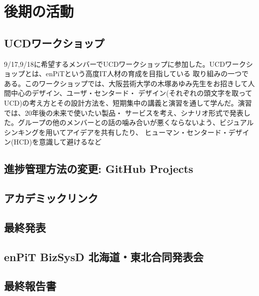 \chapter{後期の活動}

\section{UCDワークショップ}
 9/17,9/18に希望するメンバーでUCDワークショップに参加した。UCDワークショップとは、enPiTという高度IT人材の育成を目指している
取り組みの一つである。このワークショップでは、大阪芸術大学の木塚あゆみ先生をお招きして人間中心のデザイン、ユーザ・センタード・
デザイン(それぞれの頭文字を取ってUCD)の考え方とその設計方法を、短期集中の講義と演習を通して学んだ。演習では、20年後の未来で使いたい製品・
サービスを考え、シナリオ形式で発表した。グループの他のメンバーとの話の噛み合いが悪くならないよう、ビジュアルシンキングを用いてアイデアを共有したり、
ヒューマン・センタード・デザイン(HCD)を意識して避けるなど

\section{進捗管理方法の変更: GitHub Projects}

\section{アカデミックリンク}

\section{最終発表}

\section{enPiT BizSysD 北海道・東北合同発表会}

\section{最終報告書}
